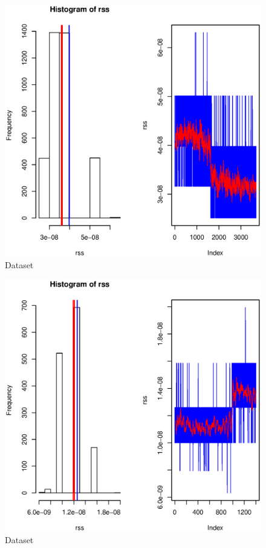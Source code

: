 \documentclass [12 pt , a4paper ] {article}
\begin{document}
\begin{figure}[!ht]
  \centering
  \includegraphics[scale=0.2]{link-5-channel-64.eps}
  \caption{Dataset}
  \label{fig:Dataset}
\end{figure}
\begin{figure}[!ht]
  \centering
  \includegraphics[scale=0.2]{link-5-channel-165.eps}
  \caption{Dataset}
  \label{fig:Dataset}
\end{figure}
\end{document}
